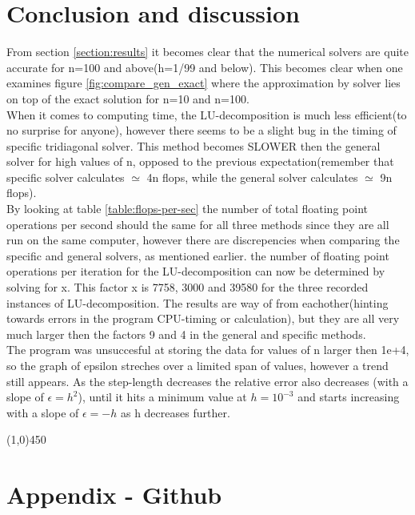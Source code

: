 \documentclass[11pt,a4paper,notitlepage]{article}
\begin{document}
\section{Conclusion and discussion}
	From section \ref{section:results} it becomes clear that the numerical solvers are quite accurate for n=100 and above(h=1/99 and below). This becomes clear when one examines figure \ref{fig:compare_gen_exact} where the approximation by solver lies on top of the exact solution for n=10 and n=100. \\
	When it comes to computing time, the LU-decomposition is much less efficient(to no surprise for anyone), however there seems to be a slight bug in the timing of specific tridiagonal solver. This method becomes SLOWER then the general solver for high values of n, opposed to the previous expectation(remember that specific solver calculates $\simeq$ 4n flops, while the general solver calculates $\simeq$ 9n flops). \\
	By looking at table \ref{table:flops-per-sec} the number of total floating point operations per second should the same for all three methods since they are all run on the same computer, however there are discrepencies when comparing the specific and general solvers, as mentioned earlier. the number of floating point operations per iteration for the LU-decomposition can now be determined by solving for x. This factor x is 7758, 3000 and 39580 for the three recorded instances of LU-decomposition. The results are way of from eachother(hinting towards errors in the program CPU-timing or calculation), but they are all very much larger then the factors 9 and 4 in the general and specific methods. \\
	The program was unsuccesful at storing the data for values of n larger then 1e+4, so the graph of epsilon streches over a limited span of values, however a trend still appears. As the step-length decreases the relative error also decreases (with a slope of $\epsilon = h^2$), until it hits a minimum value at $h=10^{-3}$ and starts increasing with a slope of $\epsilon = -h$ as h decreases further. \\	
	
\begin{center}
\line(1,0){450}
\end{center}

\newpage
\section{Appendix - Github}
\label{section:github}
\end{document}
